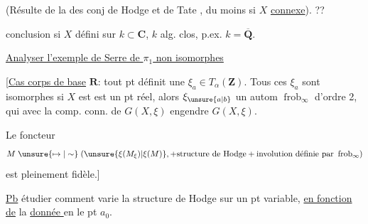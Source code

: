 (Résulte de la  des conj de Hodge et de Tate
,
du moins si $X$ \uline{connexe}).
\uline{} ??


 conclusion si $X$ défini sur $k\subset\mathbf C$, $k$ alg. clos, p.ex. $k=\overline{\mathbf Q}$.

\uline{Analyser l'exemple de Serre de $\pi_1$ non isomorphes}

[\uline{Cas corps de base} $\mathbf R$: tout pt   définit une $\xi_a\in T_\alpha(\mathbf Z)$.
Tous ces $\xi_a$ sont isomorphes  si  $X$ est
 est un pt réel, alors $\xi_{\unsure{a|b}}$  un autom $\operatorname{frob}_\infty$ d'ordre 2, qui avec la comp. conn. de $G(X,\xi)$ engendre $G(X,\xi)$.


Le foncteur
\[
M\mathrel{\unsure{\mapsto|\sim}}
(\unsure{\xi(M_\xi)|\xi(M)},+\text{structure de Hodge}+\text{involution définie par }\operatorname{frob}_\infty)
\]
est pleinement fidèle.]

\uline{Pb} étudier comment varie la structure de Hodge sur un pt  variable,
\uline{en fonction de} la \uline{donnée } en le pt $a_0$.

